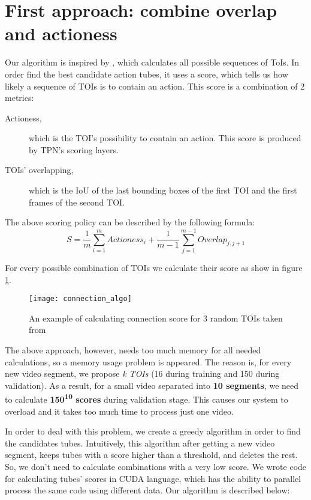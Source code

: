\section{First approach: combine overlap and actioness}
Our algorithm is inspired by \cite{DBLP:journals/corr/HouCS17}, which calculates all possible sequences of ToIs. In order find the best candidate action tubes,
it uses a score, which tells us how likely a sequence of TOIs is  to contain an action. This score is a combination of 2 metrics:
\begin{description}
\item[ Actioness,  ] which is the TOI's possibility to contain an action. This score is produced by TPN's scoring layers.
\item [ TOIs' overlapping, ] which is the IoU of the last bounding boxes of the first TOI and the first frames of the second TOI.
\end{description}

The above scoring policy can be described by the following formula:
\[ S = \frac{1}{m} \sum_ {i=1}^{m} Actioness_i + \frac{1}{m-1} \sum_{j=1}^{m-1} Overlap_{j,j+1} \]

For every possible combination of TOIs we calculate their score as show in figure \ref{fig:connection_algo}.

\begin{figure}[h]
  \centering
  \texttt{[image: connection\_algo]}
  \caption{An example of calculating connection score for 3 random TOIs taken from \cite{DBLP:journals/corr/HouCS17}}
  \label{fig:connection_algo}
\end{figure}

The above approach, however, needs too much memory for all needed calculations, so a memory usage  problem is
appeared. The reason is, for every new video segment, we propose \textit{k TOIs} (16 during training and 150 during validation).
As a result, for a small video separated into  \textbf{10 segments}, we need to calculate 
\textbf{  150\textsuperscript{10} scores} during validation stage. This causes our system to overload and it takes too much time to process
just one video. \par

In order to deal with this problem, we create a greedy algorithm in order to find the candidates tubes. Intuitively, this algorithm after
getting  a new video segment, keeps tubes with a score higher than a threshold, and deletes the rest. So, we don't need to calculate combinations with a
very low score. We wrote code for calculating tubes' scores in CUDA language, which has the ability to
parallel process the same code using different data. Our algorithm is described below:

